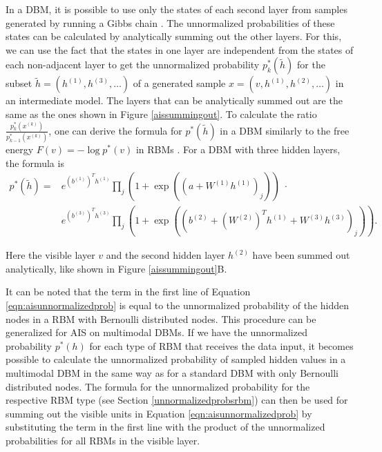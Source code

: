 \documentclass[12pt]{article}
\begin{document}
In a DBM, it is possible to use only the states of each second layer from samples generated by running a Gibbs chain \citep{salakhutdinov2008learning}. The unnormalized probabilities of these states can be calculated by analytically summing out the other layers.
For this, we can use the fact that the states in one layer are independent from the states of each non-adjacent layer to get the unnormalized probability $p_k^*(\tilde{h})$ for the subset $\tilde{h} = \left(h^{(1)}, h^{(3)}, \dots\right)$ of a generated sample $x = \left( v, h^{(1)}, h^{(2)}, \dots \right)$ in an intermediate model.
The layers that can be analytically summed out are the same as the ones shown in Figure \ref{aissummingout}.
To calculate the ratio $\frac{p_k^*(x^{(k)})}{p_{k-1}^*(x^{(k)})}$, one can derive the formula for $p^*(\tilde{h})$ in a DBM similarly to the free energy $F(v) = - \log p^*(v)$ in RBMs \citep{sala2012anefficient}. For a DBM with three hidden layers, the formula is
\begin{align}
p^*( \tilde{h} ) =&  e^{(b^{(1)})^T h^{(1)}} \prod_j (1+ \exp((a + W^{(1)} h^{(1)})_j)) \; \cdot \nonumber \\
&e^{(b^{(3)})^T h^{(3)}} \prod_{j}  \left( 1 + \exp \left( (b^{(2)} + (W^{(2)})^T h^{(1)} + W^{(3)} h^{(3)})_j \right) \right).
\label{eqn:aisunnormalizedprob}
\end{align}

Here the visible layer $v$ and the second hidden layer $h^{(2)}$ have been summed out analytically, like shown in Figure \ref{aissummingout}B.



It can be noted that the term in the first line of Equation \ref{eqn:aisunnormalizedprob} is equal to the unnormalized probability of the hidden nodes in a RBM with Bernoulli distributed nodes.
This procedure can be generalized for AIS on multimodal DBMs.
If we have the unnormalized probability $p^*(h)$ for each type of RBM that receives the data input, it becomes possible to calculate the unnormalized probability of sampled hidden values in a multimodal DBM in the same way as for a standard DBM with only Bernoulli distributed nodes.
The formula for the unnormalized probability for the respective RBM type (see Section \ref{unnormalizedprobsrbm}) can then be used for summing out the visible units in Equation \ref{eqn:aisunnormalizedprob} by substituting the term in the first line with the product of the unnormalized probabilities for all RBMs in the visible layer.
\end{document}

